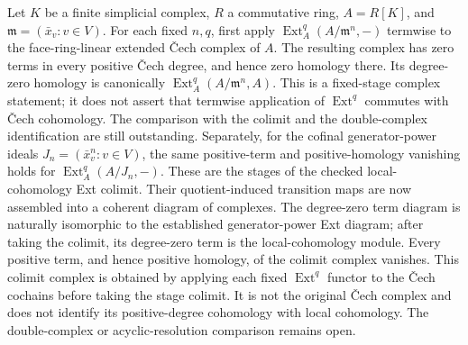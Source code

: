 \begin{theorem}\label{thm:cech-ext-complex}
Let $K$ be a finite simplicial complex, $R$ a commutative ring,
$A=R[K]$, and $\mathfrak m=(\bar x_v:v\in V)$. For each fixed $n,q$,
first apply $\operatorname{Ext}^q_A(A/\mathfrak m^n,-)$ termwise to the
face-ring-linear extended Čech complex of $A$. The resulting complex has
zero terms in every positive Čech degree, and hence zero homology there.
Its degree-zero homology is canonically $\operatorname{Ext}^q_A(A/\mathfrak m^n,A)$.
This is a fixed-stage complex statement; it does not assert that termwise
application of $\operatorname{Ext}^q$ commutes with Čech cohomology. The
comparison with the colimit and the double-complex identification are still
outstanding. Separately, for the cofinal generator-power ideals
$J_n=(\bar x_v^n:v\in V)$, the same positive-term and positive-homology
vanishing holds for $\operatorname{Ext}^q_A(A/J_n,-)$. These are the stages
of the checked local-cohomology Ext colimit. Their quotient-induced transition
maps are now assembled into a coherent diagram of complexes. The degree-zero
term diagram is naturally isomorphic to the established generator-power Ext
diagram; after taking the colimit, its degree-zero term is the local-cohomology
module. Every positive term, and hence positive homology, of the colimit
complex vanishes. This colimit complex is obtained by applying each fixed
$\operatorname{Ext}^q$ functor to the Čech cochains before taking the stage
colimit. It is not the original Čech complex and does not identify its
positive-degree cohomology with local cohomology. The double-complex or
acyclic-resolution comparison remains open.

\end{theorem}
